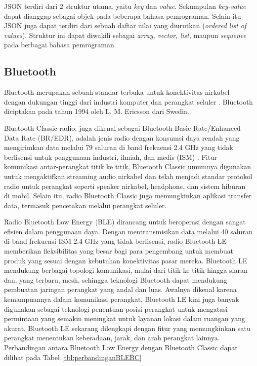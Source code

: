 JSON terdiri dari 2 struktur utama, yaitu \emph{key} dan \emph{value}. Sekumpulan \emph{key-value} dapat dianggap sebagai objek pada beberapa bahasa pemrograman. Selain itu JSON juga dapat terdiri dari sebuah daftar nilai yang diurutkan (\emph{ordered list of values}). Struktur ini dapat diwakili sebagai \emph{array, vector, list,} maupun \emph{sequence} pada berbagai bahasa pemrograman.

\subsection{Bluetooth}

Bluetooth merupakan sebuah standar terbuka untuk konektivitas nirkabel dengan dukungan tinggi dari industri komputer dan perangkat seluler \parencite{sairam2002bluetooth}. Bluetooth diciptakan pada tahun 1994 oleh L. M. Ericsson dari Swedia. 

Bluetooth Classic radio, juga dikenal sebagai Bluetooth Basic Rate/Enhanced Data Rate (BR/EDR), adalah jenis radio dengan konsumsi daya rendah yang mengirimkan data melalui 79 saluran di band frekuensi 2.4 GHz yang tidak berlisensi untuk penggunaan industri, ilmiah, dan medis (ISM) \parencite{SIG_2024}. Fitur komunikasi antar-perangkat titik ke titik, Bluetooth Classic umumnya digunakan untuk mengaktifkan streaming audio nirkabel dan telah menjadi standar protokol radio untuk perangkat seperti speaker nirkabel, headphone, dan sistem hiburan di mobil. Selain itu, radio Bluetooth Classic juga memungkinkan aplikasi transfer data, termasuk pencetakan melalui perangkat seluler.

Radio Bluetooth Low Energy (BLE) dirancang untuk beroperasi dengan sangat efisien dalam penggunaan daya. Dengan mentransmisikan data melalui 40 saluran di band frekuensi ISM 2.4 GHz yang tidak berlisensi, radio Bluetooth LE memberikan fleksibilitas yang besar bagi para pengembang untuk membuat produk yang sesuai dengan kebutuhan konektivitas pasar mereka. Bluetooth LE mendukung berbagai topologi komunikasi, mulai dari titik ke titik hingga siaran dan, yang terbaru, mesh, sehingga teknologi Bluetooth dapat mendukung pembuatan jaringan perangkat yang andal dan luas. Awalnya dikenal karena kemampuannya dalam komunikasi perangkat, Bluetooth LE kini juga banyak digunakan sebagai teknologi penentuan posisi perangkat untuk mengatasi permintaan yang semakin meningkat untuk layanan lokasi dalam ruangan yang akurat. Bluetooth LE sekarang dilengkapi dengan fitur yang memungkinkan satu perangkat menentukan keberadaan, jarak, dan arah perangkat lainnya. Perbandingan antara Bluetooth Low Energy dengan Bluetooth Classic dapat dilihat pada Tabel \ref{tbl:perbandinganBLEBC}

